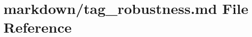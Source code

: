 \hypertarget{tag__robustness_8md}{}\section{markdown/tag\+\_\+robustness.md File Reference}
\label{tag__robustness_8md}
